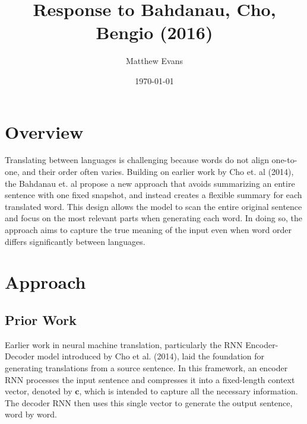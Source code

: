 \documentclass[10pt]{article}
\title{
    Response to Bahdanau, Cho, Bengio (2016) \\
}
\author{Matthew Evans}
\date{\today}
\begin{document}
\maketitle

\section*{Overview}
Translating between languages is challenging because words do not align one-to-one, and their order often varies. Building on earlier work by Cho et. al (2014)\cite{cho2014}, the Bahdanau et. al propose a new approach\cite{bahdanau2016} that avoids summarizing an entire sentence with one fixed snapshot, and instead creates a flexible summary for each translated word. This design allows the model to scan the entire original sentence and focus on the most relevant parts when generating each word. In doing so, the approach aims to capture the true meaning of the input even when word order differs significantly between languages.



\section*{Approach}
\subsection*{Prior Work}
Earlier work in neural machine translation, particularly the RNN Encoder-Decoder model introduced by Cho et al. (2014), laid the foundation for generating translations from a source sentence. In this framework, an encoder RNN processes the input sentence and compresses it into a fixed-length context vector, denoted by $\mathbf{c}$, which is intended to capture all the necessary information. The decoder RNN then uses this single vector to generate the output sentence, word by word.
\end{document}
